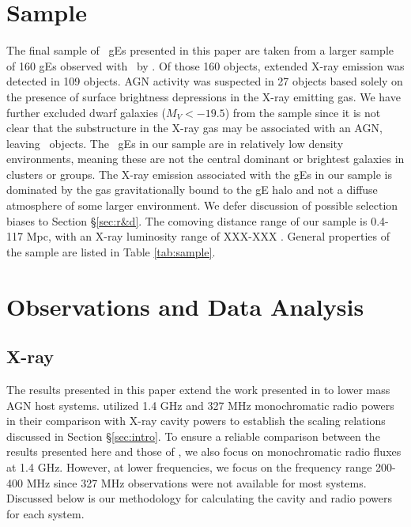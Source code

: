 \documentclass{emulateapj}
\begin{document}
\section{Sample}
\label{sec:sample}

The final sample of \samp\ gEs presented in this paper are taken from
a larger sample of 160 gEs observed with \chandra\ by
\citet{jonesge}. Of those 160 objects, extended X-ray emission was
detected in 109 objects. AGN activity was suspected in 27 objects
based solely on the presence of surface brightness depressions in the
X-ray emitting gas. We have further excluded dwarf galaxies ($M_V <
-19.5$) from the sample since it is not clear that the substructure in
the X-ray gas may be associated with an AGN, leaving
\samp\ objects. The \samp\ gEs in our sample are in relatively low
density environments, meaning these are not the central dominant or
brightest galaxies in clusters or groups. The X-ray emission
associated with the gEs in our sample is dominated by the gas
gravitationally bound to the gE halo and not a diffuse atmosphere of
some larger environment. We defer discussion of possible selection
biases to Section \S\ref{sec:r&d}. The comoving distance range of our
sample is 0.4-117 Mpc, with an X-ray luminosity range of XXX-XXX
\lum. General properties of the sample are listed in Table
\ref{tab:sample}.



\section{Observations and Data Analysis}
\label{sec:data}

\subsection{X-ray}
\label{sec:xray}

The results presented in this paper extend the work presented in
\citet{birzan08} to lower mass AGN host systems. \citet{birzan08}
utilized 1.4 GHz and 327 MHz monochromatic radio powers in their
comparison with X-ray cavity powers to establish the scaling relations
discussed in Section \S\ref{sec:intro}. To ensure a reliable
comparison between the results presented here and those of
\citet{birzan08}, we also focus on monochromatic radio fluxes at 1.4
GHz. However, at lower frequencies, we focus on the frequency range
200-400 MHz since 327 MHz observations were not available for most
systems. Discussed below is our methodology for calculating the cavity
and radio powers for each system.
\end{document}
